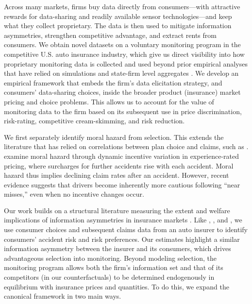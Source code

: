 Across many markets, firms buy data directly from consumers---with attractive rewards for data-sharing and readily available sensor technologies---and keep what they collect proprietary. The data is then used to mitigate information asymmetries, strengthen competitive advantage, and extract rents from consumers. We obtain novel datasets on a voluntary monitoring program in the competitive U.S. auto insurance industry, which give us direct visibility into how proprietary monitoring data is collected and used beyond prior empirical analyses that have relied on simulations \parencites{Bordoff2008} and state-firm level aggregates \parencites{Hubbard2000, Reimers2018, porrini2020black}. We develop an empirical framework that embeds the firm's data elicitation strategy, and consumers' data-sharing choices, inside the broader product (insurance) market pricing and choice problems. This allows us to account for the value of monitoring data to the firm based on its subsequent use in price discrimination, risk-rating, competitive cream-skimming, and risk reduction.

We first separately identify moral hazard from selection. This extends the literature that has relied on correlations between plan choice and claims, such as \textcite{Chiappori2000, Cohen2007}. \textcite{abbring2008better, jeziorski2019skimming} examine moral hazard through dynamic incentive variation in experience-rated pricing, where surcharges for further accidents rise with each accident. Moral hazard thus implies declining claim rates after an accident. However, recent evidence suggests that drivers become inherently more cautious following ``near misses,'' even when no incentive changes occur\parencite{shum2022time}.

Our work builds on a structural literature measuring the extent and welfare implications of information asymmetries in insurance markets \parencites{einav2010estimating}. Like \textcite{Cohen2007}, \textcite{Barseghyan2013b}, and \textcites{jeziorski2019skimming}, we use consumer choices and subsequent claims data from an auto insurer to identify consumers' accident risk and risk preferences. Our estimates highlight a similar information asymmetry between the insurer and its consumers, which drives advantageous selection into monitoring. Beyond modeling selection, the monitoring program allows both the firm's information set and that of its competitors (in our counterfactuals) to be determined endogenously in equilibrium with insurance prices and quantities. To do this, we expand the canonical framework in two main ways.

